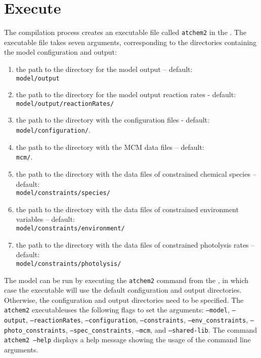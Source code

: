 \section{Execute} \label{sec:execute}

The compilation process creates an executable file called
\texttt{atchem2} in the \maindir. The executable file
takes seven arguments, corresponding to the directories containing the
model configuration and output:

\begin{enumerate}
\item the path to the directory for the model output -- default:\\
  \texttt{model/output}
\item the path to the directory for the model output reaction rates -
  default:\\ \texttt{model/output/reactionRates/}
\item the path to the directory with the configuration files -
  default:\\ \texttt{model/configuration/}.
\item the path to the directory with the MCM data files -- default:\\
  \texttt{mcm/}.
\item the path to the directory with the data files of constrained
  chemical species -- default:\\ \texttt{model/constraints/species/}
\item the path to the directory with the data files of constrained
  environment variables -- default:\\
  \texttt{model/constraints/environment/}
\item the path to the directory with the data files of constrained
  photolysis rates -- default:\\
  \texttt{model/constraints/photolysis/}
\end{enumerate}

The model can be run by executing the \texttt{atchem2} command from
the \maindir, in which case the executable will use the
default configuration and output directories. Otherwise, the
configuration and output directories need to be specified. The
\texttt{atchem2} executableuses the following flags to set the
arguments: \texttt{--model}, \texttt{--output},
\texttt{--reactionRates}, \texttt{--configuration},
\texttt{--constraints}, \texttt{--env\_constraints},
\texttt{--photo\_constraints}, \texttt{--spec\_constraints},
\texttt{--mcm}, and \texttt{--shared-lib}. The command \texttt{atchem2
  --help} displays a help message showing the usage of the command
line arguments.

